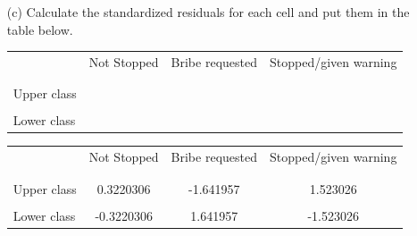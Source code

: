 \documentclass[12pt,letterpaper]{article}
\begin{document}
 \begin{enumerate}
 	\item [(c)]
    Calculate the standardized residuals for each cell and put them in the table below. \\
    	\begin{table}[h]
    	\centering
    	\begin{tabular}{l | c c c }
    		& Not Stopped & Bribe requested & Stopped/given warning \\
    		\\[-1.8ex] 
    		\hline \\[-1.8ex]
    		Upper class   \\
    		\\
    		Lower class   \\
    		
    	\end{tabular}
    \end{table}
 	
 	\begin{table}[h]
 	\centering
 	\begin{tabular}{l | c c c }
 		& Not Stopped & Bribe requested & Stopped/given warning \\
 		\\[-1.8ex] 
 		\hline \\[-1.8ex]
 		Upper class  &0.3220306  &-1.641957  &1.523026  \\
 		\\
 		Lower class  &-0.3220306  &1.641957   &-1.523026 \\
 		
 	\end{tabular}
 \end{table}
 \end{enumerate}
 
 	\vspace{5cm}
 
\end{document}
